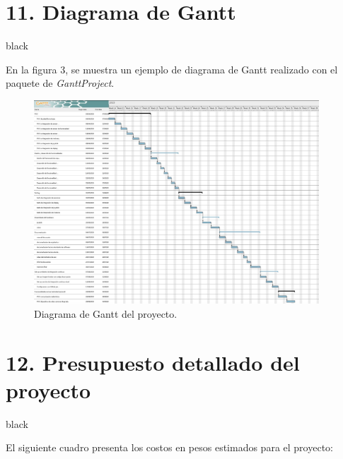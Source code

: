 \documentclass[
11pt, %
codirector, %
]{charter}
\begin{document}
\section{11. Diagrama de Gantt}
\label{sec:gantt}

\begin{consigna}{black}

En la figura 3, se muestra un ejemplo de diagrama de Gantt realizado con el paquete de \textit{GanttProject}. 

\begin{figure}[htpb]
\centering 
\includegraphics[width=0.95\textwidth]{./Figuras/Captura_Robot_Plan.png}
\caption{Diagrama de Gantt del proyecto.}
\label{fig:diagGantt}
\end{figure}
\end{consigna}

\section{12. Presupuesto detallado del proyecto}
\label{sec:presupuesto}

\begin{consigna}{black}

El siguiente cuadro presenta los costos en pesos estimados para el proyecto:

\end{consigna}
\end{document}
